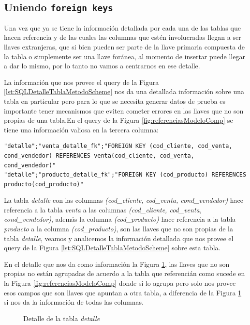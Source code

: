 \subsection{Uniendo \texttt{foreign keys}}
Una vez que ya se tiene la informaci\'on detallada por cada una de las tablas que hacen referencia y de las cuales las columnas que est\'en involucradas llegan a ser llaves extranjeras, que si bien pueden ser parte de la llave primaria compuesta de la tabla o simplemente ser una llave for\'anea, al momento de insertar puede llegar a dar lo mismo, por lo tanto no vamos a centrarnos en ese detalle.

La informaci\'on que nos provee el query de la Figura \ref{lst:SQLDetalleTablaMetodoScheme} nos da una detallada informaci\'on sobre una tabla en particular pero para lo que se necesita generar datos de prueba es importante tener mecanismos que eviten cometer errores en las llaves que no son propias de una tabla.En el query de la Figura \ref{fig:referenciasModeloComp} se tiene una informaci\'on valiosa en la tercera columna:

\lstset{language=sql,breaklines=true}
\begin{lstlisting}
"detalle";"venta_detalle_fk";"FOREIGN KEY (cod_cliente, cod_venta, cond_vendedor) REFERENCES venta(cod_cliente, cod_venta, cond_vendedor)"
"detalle";"producto_detalle_fk";"FOREIGN KEY (cod_producto) REFERENCES producto(cod_producto)"
\end{lstlisting}
La tabla \textit{detalle} con las columnas \textit{(cod\_cliente, cod\_venta, cond\_vendedor)} hace referencia a la tabla \textit{venta} a las columnas \textit{(cod\_cliente, cod\_venta, cond\_vendedor)}, adem\'as la columna \textit{(cod\_producto)} hace referencia a la tabla \textit{producto} a la columna \textit{(cod\_producto)}, son las llaves que no son propias de la tabla \textit{detalle}, veamos y analicemos la informaci\'on detallada que nos provee el query de la Figura \ref{lst:SQLDetalleTablaMetodoScheme} sobre esta tabla.

En el detalle que nos da como informaci\'on la Figura \ref{fig:detalleTablaDetalle},  las llaves que no son propias no est\'an agrupadas de acuerdo a la tabla que referenci\'an como sucede en la Figura \ref{fig:referenciasModeloComp} donde si lo agrupa pero solo nos provee esos campos que son llaves que apuntan a otra tabla, a diferencia de la Figura \ref{fig:detalleTablaDetalle} si nos da la informaci\'on de todas las columnas.

\begin{figure}[H]
\centering
{}
\caption{Detalle de la tabla \textit{detalle}} \label{fig:detalleTablaDetalle}
\end{figure}

